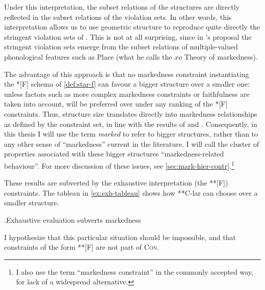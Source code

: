 Under this interpretation, the subset relations of the structures are directly reflected in the subset relations of the violation sets. In other words, this interpretation allows us to use geometric structure to reproduce quite directly the stringent violation sets of \citet{delacy2002,lacy04:_marked_optim_theor,delacy2006}. This is not at all surprising, since in \citeauthor{delacy2006}'s proposal the stringent violation sets emerge from the subset relations of multiple\hyp valued phonological features such as Place (what he calls the $xo$ Theory of markedness).

The advantage of this approach is that no markedness constraint instantiating the *[F] schema of \cref{def:star-f} can favour a bigger structure over a smaller one: unless factors such as more complex markedness constraints or faithfulness are taken into account,  will be preferred over  under any ranking of the *[F] constraints. Thus, structure size translates directly into markedness relationships as defined by the constraint set, in line with the results of \citet{causley99:_compl_optim_theor} and \citet{rice03:_featur}. Consequently, in this thesis I will use the term \emph{marked} to refer to bigger structures, rather than to any other sense of \enquote{markedness} current in the literature. I will call the cluster of properties associated with these bigger structures \citep{rice03:_featur,delacy2006} \enquote{markedness\hyp related behaviour}. For more discussion of these issues, see \cref{sec:mark-hier-contr}.\footnote{I also use the term \enquote{markedness constraint} in the commonly accepted way, for lack of a widespread alternative.}

These results are subverted by the exhaustive interpretation (\ie the **[F]) constraints. The tableau in \ref{ex:exh-tableau} shows how **C-lar can choose  over a smaller structure.

\ex.\label{ex:exh-tableau}Exhaustive evaluation subverts markedness\\
\begin{OTtableau}{6}
\OTcandrow{\featurestring{\rt}}{*!,,,,,*}
\end{OTtableau}

I hypothesize that this particular situation should be impossible, and that constraints of the form **[F] are not part of \textsc{Con}.

